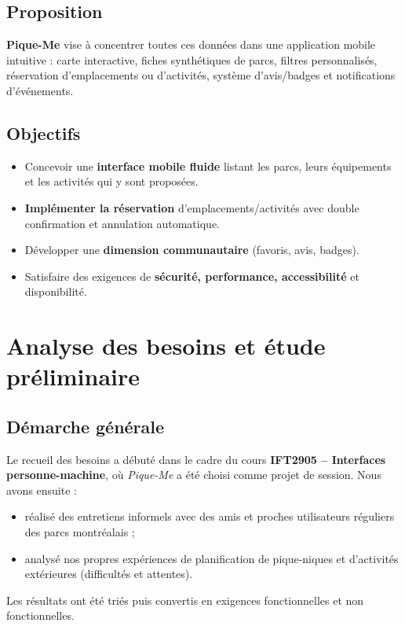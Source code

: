 \documentclass[12pt,a4paper]{article}
\begin{document}
\subsection*{Proposition}
\textbf{Pique-Me} vise à concentrer toutes ces données dans une
application mobile intuitive : carte interactive, fiches synthétiques de
parcs, filtres personnalisés, réservation d'emplacements ou d'activités,
système d'avis/badges et notifications d'événements.

\subsection*{Objectifs}
\vspace{-0.25\baselineskip}
\begin{itemize}[nosep]
  \item Concevoir une \textbf{interface mobile fluide} listant les parcs,
        leurs équipements et les activités qui y sont proposées.
  \item \textbf{Implémenter la réservation} d'emplacements/activités
        avec double confirmation et annulation automatique.
  \item Développer une \textbf{dimension communautaire} (favoris, avis,
        badges).
  \item Satisfaire des exigences de \textbf{sécurité, performance,
        accessibilité} et disponibilité.
\end{itemize}

\clearpage
\section{Analyse des besoins et étude préliminaire}

\subsection{Démarche générale}
Le recueil des besoins a débuté dans le cadre du cours
\textbf{IFT2905 – Interfaces personne-machine}, où \emph{Pique-Me} a été
choisi comme projet de session. Nous avons ensuite :
\begin{itemize}
  \item réalisé des entretiens informels avec des amis et proches
        utilisateurs réguliers des parcs montréalais ;
  \item analysé nos propres expériences de planification de pique-niques
        et d'activités extérieures (difficultés et attentes).
\end{itemize}
Les résultats ont été triés puis convertis en
exigences fonctionnelles et non fonctionnelles.
\end{document}
